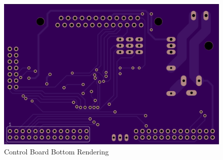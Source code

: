 \begin{figure}[h]
	\centering
	\includegraphics[width=1\textwidth]{pcb-design/cbottomrender.png}
	\caption{Control Board Bottom Rendering}
	\label{fig:control-bottom-render}
\end{figure}

%


